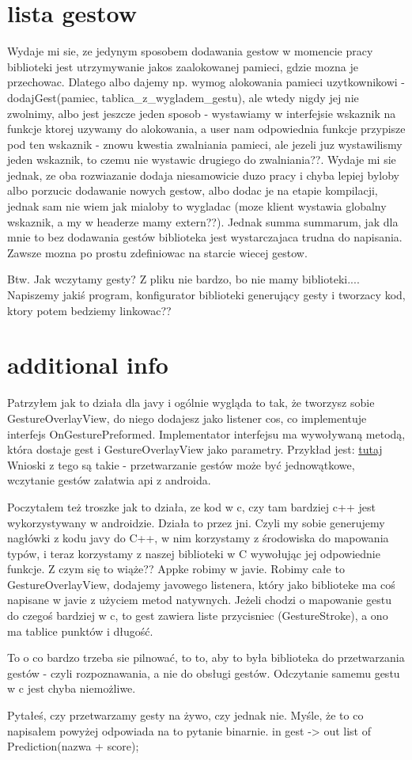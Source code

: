 \documentclass[10pt,a4paper]{article}
\begin{document}
\section{lista gestow}
Wydaje mi sie, ze jedynym sposobem dodawania gestow w momencie pracy biblioteki jest utrzymywanie jakos zaalokowanej pamieci, gdzie mozna je przechowac.
Dlatego albo dajemy np. wymog alokowania pamieci uzytkownikowi - dodajGest(pamiec, tablica_z_wygladem_gestu), ale wtedy nigdy jej nie zwolnimy, albo jest jeszcze jeden sposob - 
wystawiamy w interfejsie wskaznik na funkcje ktorej uzywamy do alokowania, a user nam odpowiednia funkcje przypisze pod ten wskaznik - znowu kwestia zwalniania pamieci, ale jezeli juz wystawilismy jeden wskaznik, to czemu nie wystawic drugiego do zwalniania??. Wydaje mi sie jednak, ze oba rozwiazanie dodaja niesamowicie duzo pracy i chyba lepiej byloby albo porzucic dodawanie nowych gestow, albo dodac je na etapie kompilacji, jednak sam nie wiem jak mialoby to wygladac (moze klient wystawia globalny wskaznik, a my w headerze mamy extern??). Jednak summa summarum, jak dla mnie to bez dodawania gestów biblioteka jest wystarczajaca trudna do napisania. Zawsze mozna po prostu zdefiniowac na starcie wiecej gestow. 

Btw. Jak wczytamy gesty? Z pliku nie bardzo, bo nie mamy biblioteki.... Napiszemy jakiś program, konfigurator biblioteki generujący gesty i tworzacy kod, ktory potem bedziemy linkowac??

\section{additional info}
Patrzyłem jak to działa dla javy i ogólnie wygląda to tak, że tworzysz sobie GestureOverlayView, do niego dodajesz jako listener cos, co implementuje interfejs OnGesturePreformed. Implementator interfejsu ma wywoływaną metodą, która dostaje gest i GestureOverlayView jako parametry. Przykład jest: \href{http://www.vogella.com/articles/AndroidGestures/article.html}{tutaj} Wnioski z tego są takie - przetwarzanie gestów może być jednowątkowe, wczytanie gestów załatwia api z androida.

Poczytałem też troszke jak to działa, ze kod w c, czy tam bardziej c++ jest wykorzystywany w androidzie. Działa to przez jni. Czyli my sobie generujemy nagłówki z kodu javy do C++, w nim korzystamy z środowiska do mapowania typów, i teraz korzystamy z naszej biblioteki w C wywołując jej odpowiednie funkcje. Z czym się to wiąże?? Appke robimy w javie.
Robimy całe to GestureOverlayView, dodajemy javowego listenera, który jako biblioteke ma coś napisane w javie z użyciem metod natywnych. Jeżeli chodzi o mapowanie gestu do czegoś bardziej w c, to gest zawiera liste przycisniec (GestureStroke), a ono ma tablice punktów i długość.

To o co bardzo trzeba sie pilnować, to to, aby to była biblioteka do przetwarzania gestów - czyli rozpoznawania, a nie do obsługi gestów.
Odczytanie samemu gestu w c jest chyba niemożliwe.

Pytałeś, czy przetwarzamy gesty na żywo, czy jednak nie. Myśle, że to co napisałem powyżej odpowiada na to pytanie \- binarnie. in gest -> out list of Prediction(nazwa + score);
\end{document}
